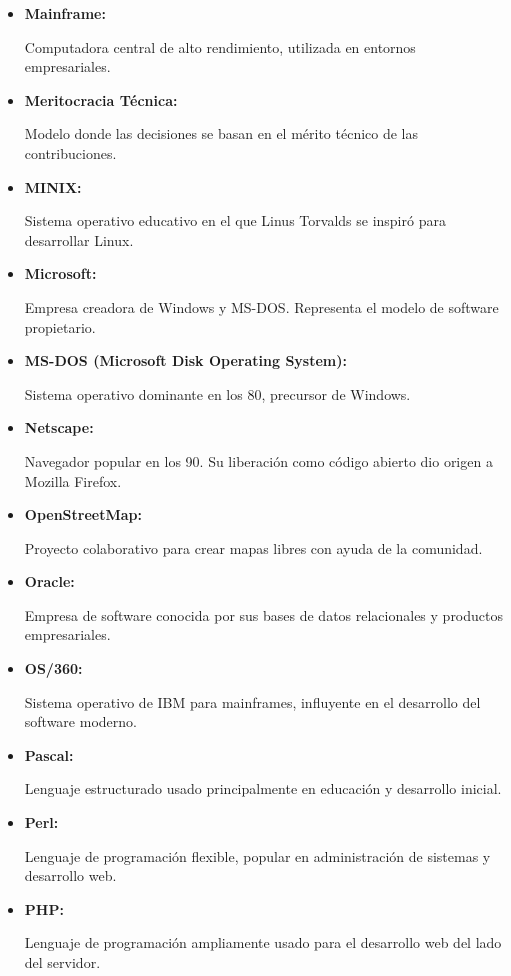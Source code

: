 \documentclass[a4paper,12pt]{article}
\begin{document}
\begin{itemize}
\item \hypertarget{mainframe}{\textbf{Mainframe:}} Computadora central de alto
rendimiento, utilizada en entornos empresariales.  \label{mainframe}

\item \hypertarget{meritocracia}{\textbf{Meritocracia Técnica:}} Modelo donde
las decisiones se basan en el mérito técnico de las contribuciones.
\label{meritocracia}

\item \hypertarget{minix}{\textbf{MINIX:}} Sistema operativo educativo en el que
Linus Torvalds se inspiró para desarrollar Linux.  \label{minix}

\item \hypertarget{microsoft}{\textbf{Microsoft:}} Empresa creadora de Windows y
MS-DOS. Representa el modelo de software propietario.  \label{microsoft}

\item \hypertarget{msdos}{\textbf{MS-DOS (Microsoft Disk Operating System):}}
Sistema operativo dominante en los 80, precursor de Windows.  \label{msdos}

\item \hypertarget{netscape}{\textbf{Netscape:}} Navegador popular en los 90. Su
liberación como código abierto dio origen a Mozilla Firefox.  \label{netscape}

\item \hypertarget{openstreetmap}{\textbf{OpenStreetMap:}} Proyecto colaborativo
para crear mapas libres con ayuda de la comunidad.  \label{openstreetmap}

\item \hypertarget{oracle}{\textbf{Oracle:}} Empresa de software conocida por
sus bases de datos relacionales y productos empresariales.  \label{oracle}

\item \hypertarget{os360}{\textbf{OS/360:}} Sistema operativo de IBM para
mainframes, influyente en el desarrollo del software moderno.  \label{os360}

\item \hypertarget{pascal}{\textbf{Pascal:}} Lenguaje estructurado usado
principalmente en educación y desarrollo inicial.  \label{pascal}

\item \hypertarget{perl}{\textbf{Perl:}} Lenguaje de programación flexible,
popular en administración de sistemas y desarrollo web.  \label{perl}

\item \hypertarget{php}{\textbf{PHP:}} Lenguaje de programación ampliamente
usado para el desarrollo web del lado del servidor.  \label{php}


\end{itemize}
\end{document}
